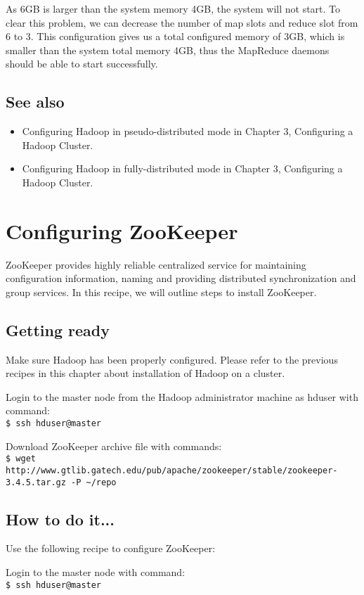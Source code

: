 As 6GB is larger than the system memory 4GB, the system will not start. To clear this problem, we can decrease the number of map slots and reduce slot from 6 to 3. This configuration gives us a total configured memory of 3GB, which is smaller than the system total memory 4GB, thus the MapReduce daemons should be able to start successfully.

\subsection*{See also}
\begin{itemize}
\item Configuring Hadoop in pseudo-distributed mode in Chapter 3, Configuring a Hadoop Cluster.
\item Configuring Hadoop in fully-distributed mode in Chapter 3, Configuring a Hadoop Cluster.
\end{itemize}

\section{Configuring ZooKeeper}
ZooKeeper provides highly reliable centralized service for maintaining configuration information, naming and providing distributed synchronization and group services. In this recipe, we will outline steps to install ZooKeeper.

\subsection*{Getting ready}
Make sure Hadoop has been properly configured. Please refer to the previous recipes in this chapter about installation of Hadoop on a cluster.

Login to the master node from the Hadoop administrator machine as hduser with command: \\
\verb|$ ssh hduser@master|

Download ZooKeeper archive file with commands: \\
\verb|$ wget http://www.gtlib.gatech.edu/pub/apache/zookeeper/stable/zookeeper-3.4.5.tar.gz -P ~/repo|

\subsection*{How to do it...}
Use the following recipe to configure ZooKeeper:

Login to the master node with command: \\
\verb|$ ssh hduser@master|

